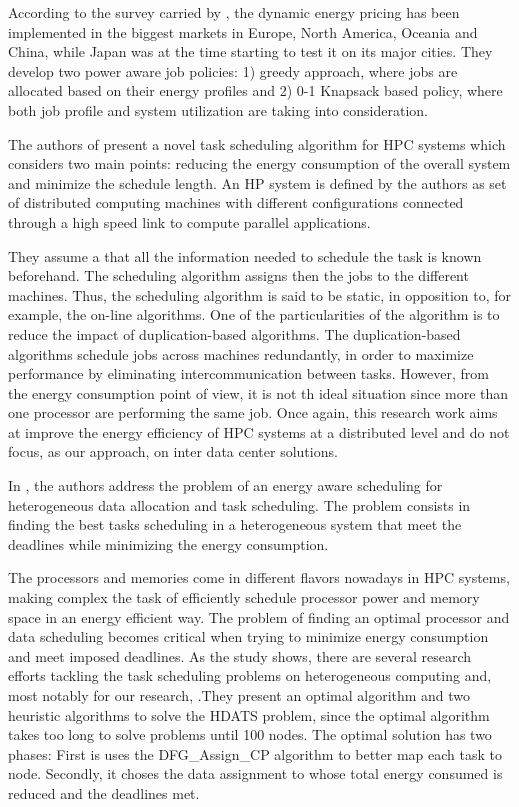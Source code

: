 According to the survey carried by \cite{DYN_PRICING_HPC}, the dynamic energy
pricing has been implemented in the biggest markets in Europe, North America,
Oceania and China, while Japan was at the time starting to test it on its major
cities. They develop two power aware job policies: 1) greedy approach, where jobs are
allocated based on their energy profiles  and 2) 0-1 Knapsack based policy,
where both job profile and system utilization are taking into consideration.

The authors of \cite{SCHED_HETEROGE} present a novel task scheduling algorithm
for HPC systems which considers two main points: reducing the energy consumption
of the overall system and minimize the schedule length. An HP system is defined
by the authors as set of distributed computing machines with different
configurations connected through a high speed link to compute parallel
applications.

They assume a that all the information needed to schedule the task is known
beforehand. The scheduling algorithm assigns then the jobs to the different
machines. Thus, the scheduling algorithm is said to be static, in opposition to,
for example, the on-line algorithms.  One of the particularities of the algorithm is to reduce the impact of
duplication-based algorithms. The duplication-based algorithms schedule jobs
across machines redundantly, in order to maximize performance by eliminating
intercommunication between tasks. However, from the energy consumption point of
view, it is not th ideal situation since more than one processor are performing
the same job. Once again, this research work aims at improve the energy efficiency of HPC
systems at a distributed level and do not focus, as our approach, on inter data
center solutions.

 In \cite{TASK_SCHED}, the authors address the problem of an energy aware
scheduling for heterogeneous data allocation and task scheduling. The problem
consists in finding the best tasks scheduling in a heterogeneous system that meet
the deadlines while minimizing the energy consumption.

The processors and memories come in different flavors nowadays in HPC
systems, making complex the task of efficiently schedule processor power and 
memory space in an energy efficient way. The problem of finding an optimal
processor and data scheduling becomes critical when trying to minimize energy 
consumption and meet imposed deadlines. As the study shows, there are several research efforts tackling the task
scheduling problems on heterogeneous computing and, most notably for our
research, \cite{EFF_DSP}.They present an optimal algorithm and two heuristic algorithms to solve the
HDATS problem, since the optimal algorithm takes too long to solve problems
until 100 nodes. The optimal solution has two phases: First is uses the
DFG\_Assign\_CP algorithm to better map each task to node. Secondly, it choses the
data assignment to whose total energy consumed is reduced and the deadlines met.


